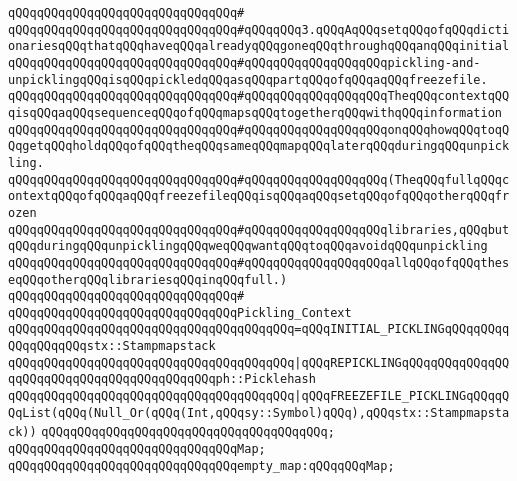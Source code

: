 \verb|qQQqqQQqqQQqqQQqqQQqqQQqqQQqqQQq#|\newline
\verb|qQQqqQQqqQQqqQQqqQQqqQQqqQQqqQQq#qQQqqQQq3.qQQqAqQQqsetqQQqofqQQqdictionariesqQQqthatqQQqhaveqQQqalreadyqQQqgoneqQQqthroughqQQqanqQQqinitial|\newline
\verb|qQQqqQQqqQQqqQQqqQQqqQQqqQQqqQQq#qQQqqQQqqQQqqQQqqQQqpickling-and-unpicklingqQQqisqQQqpickledqQQqasqQQqpartqQQqofqQQqaqQQqfreezefile.|\newline
\verb|qQQqqQQqqQQqqQQqqQQqqQQqqQQqqQQq#qQQqqQQqqQQqqQQqqQQqTheqQQqcontextqQQqisqQQqaqQQqsequenceqQQqofqQQqmapsqQQqtogetherqQQqwithqQQqinformation|\newline
\verb|qQQqqQQqqQQqqQQqqQQqqQQqqQQqqQQq#qQQqqQQqqQQqqQQqqQQqonqQQqhowqQQqtoqQQqgetqQQqholdqQQqofqQQqtheqQQqsameqQQqmapqQQqlaterqQQqduringqQQqunpickling.|\newline
\verb|qQQqqQQqqQQqqQQqqQQqqQQqqQQqqQQq#qQQqqQQqqQQqqQQqqQQq(TheqQQqfullqQQqcontextqQQqofqQQqaqQQqfreezefileqQQqisqQQqaqQQqsetqQQqofqQQqotherqQQqfrozen|\newline
\verb|qQQqqQQqqQQqqQQqqQQqqQQqqQQqqQQq#qQQqqQQqqQQqqQQqqQQqlibraries,qQQqbutqQQqduringqQQqunpicklingqQQqweqQQqwantqQQqtoqQQqavoidqQQqunpickling|\newline
\verb|qQQqqQQqqQQqqQQqqQQqqQQqqQQqqQQq#qQQqqQQqqQQqqQQqqQQqallqQQqofqQQqtheseqQQqotherqQQqlibrariesqQQqinqQQqfull.)|\newline
\verb|qQQqqQQqqQQqqQQqqQQqqQQqqQQqqQQq#|\newline
\verb|qQQqqQQqqQQqqQQqqQQqqQQqqQQqqQQqPickling_Context|\newline
\verb|qQQqqQQqqQQqqQQqqQQqqQQqqQQqqQQqqQQqqQQq=qQQqINITIAL_PICKLINGqQQqqQQqqQQqqQQqqQQqstx::Stampmapstack|\newline
\verb|qQQqqQQqqQQqqQQqqQQqqQQqqQQqqQQqqQQqqQQq|\verb#|qQQqREPICKLINGqQQqqQQqqQQqqQQqqQQqqQQqqQQqqQQqqQQqqQQqqQQqph::Picklehash#\newline
\verb|qQQqqQQqqQQqqQQqqQQqqQQqqQQqqQQqqQQqqQQq|\verb#|qQQqFREEZEFILE_PICKLINGqQQqqQQqList(qQQq(Null_Or(qQQq(Int,qQQqsy::Symbol)qQQq),qQQqstx::Stampmapstack))#\newline
\verb|qQQqqQQqqQQqqQQqqQQqqQQqqQQqqQQqqQQqqQQq;|\newline
\newline
\verb|qQQqqQQqqQQqqQQqqQQqqQQqqQQqqQQqMap;|\newline
\newline
\verb|qQQqqQQqqQQqqQQqqQQqqQQqqQQqqQQqempty_map:qQQqqQQqMap;|\newline
\newline
